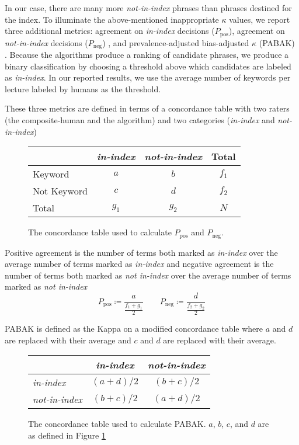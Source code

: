 In our case, there are many more {\em not-in-index} phrases than
phrases destined for the index. To illuminate the above-mentioned
inappropriate $\kappa$ values, we report three additional metrics:
agreement on {\em in-index} decisions ($P_{\text{pos}}$), agreement on
{\em not-in-index} decisions ($P_{\text{neg}}$)
\cite{cicchetti1990high}, and prevalence-adjusted bias-adjusted
$\kappa$ (PABAK) \cite{byrt1993bias}. Because the algorithms produce a
ranking of candidate phrases, we produce a binary classification by
choosing a threshold above which candidates are labeled as {\em
  in-index}. In our reported results, we use the average number of
keywords per lecture labeled by humans as the threshold.

These three metrics are defined in terms of a concordance table with
two raters (the composite-human and the algorithm) and two
categories ({\em in-index} and {\em not-in-index})

\begin{figure}[h]
\caption{The concordance table used to calculate $P_{\text{pos}}$ and $P_{\text{neg}}$. }
\label{fig:concordance_1}
\begin{tabular}{l || c c c}
& {\em in-index} & {\em not-in-index} & Total \\
\hline \hline
Keyword & $a$ & $b$ & $f_1$ \\
Not Keyword & $c$ & $d$ & $f_2$ \\
Total & $g_1$ & $g_2$ & $N$ \\
\end{tabular}
\end{figure}

Positive agreement is the number of terms both marked as {\em
  in-index} over the average number of terms marked as {\em in-index} and
negative agreement is the number of terms both marked as {\em not
  in-index} over the average number of terms marked as {\em not
  in-index}
\begin{equation*}
P_{\text{pos}} \coloneqq \frac{a}{\frac{f_1 + g_1}{2}}
 \qquad P_{\text{neg}} \coloneqq \frac{d}{\frac{f_2 + g_2}{2}}
\end{equation*}

PABAK is defined as the Kappa on a modified concordance table where $a$ and $d$ are replaced with their average and $c$ and $d$ are replaced with their average.

\begin{figure}[h]
\caption{The concordance table used to calculate PABAK. $a$, $b$, $c$, and $d$ are as defined in Figure \ref{fig:concordance_1}}
\begin{tabular}{l || c c }
& {\em in-index} & {\em not-in-index} \\
\hline \hline
{\em in-index} & $(a + d) / 2$ & $(b + c) / 2$ \\
{\em not-in-index} & $(b + c) / 2$ & $(a + d) / 2$ \\
\end{tabular}
\end{figure}

